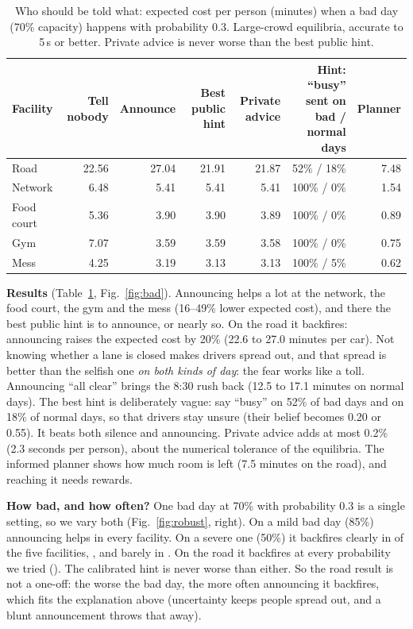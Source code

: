 \documentclass{article}
\begin{document}
\begin{table}[t]\centering\small
\caption{Who should be told what: expected cost per person (minutes) when a bad day (70\% capacity) happens with
probability 0.3. Large-crowd equilibria, accurate to 5\,s or better. Private advice is never worse than the best public hint.}\label{tab:bad}
\begin{tabular}{@{}lrrrrr|r@{}}\toprule
Facility & Tell nobody & Announce & Best public hint & Private advice & Hint: ``busy'' sent on bad / normal days & Planner\\\midrule
Road & 22.56 & \textcolor{cNE}{27.04} & 21.91 & 21.87 & 52\% / 18\% & 7.48\\
Network & 6.48 & 5.41 & 5.41 & 5.41 & 100\% / 0\% & 1.54\\
Food court & 5.36 & 3.90 & 3.90 & 3.89 & 100\% / 0\% & 0.89\\
Gym & 7.07 & 3.59 & 3.59 & 3.58 & 100\% / 0\% & 0.75\\
Mess & 4.25 & 3.19 & 3.13 & 3.13 & 100\% / 5\% & 0.62\\\bottomrule
\end{tabular}
\end{table}

\textbf{Results} (Table~\ref{tab:bad}, Fig.~\ref{fig:bad}). Announcing helps a lot at the network, the food court,
the gym and the mess (16--49\% lower expected cost), and there the best public hint is to announce, or nearly so. On
the road it backfires: announcing raises the expected cost by 20\% (22.6 to 27.0 minutes per car). Not knowing
whether a lane is closed makes drivers spread out, and that spread is better than the selfish one \emph{on both kinds
of day}: the fear works like a toll. Announcing ``all clear'' brings the 8:30 rush back (12.5 to 17.1 minutes on
normal days). The best hint is deliberately vague: say ``busy'' on 52\% of bad days and on 18\% of normal days, so
that drivers stay unsure (their belief becomes 0.20 or 0.55). It beats both silence and announcing. Private advice
adds at most 0.2\% (2.3 seconds per person), about the numerical tolerance of the equilibria. The informed planner
shows how much room is left (7.5 minutes on the road), and reaching it needs rewards.

\textbf{How bad, and how often?} One bad day at 70\% with probability 0.3 is a single setting, so we vary both
(Fig.~\ref{fig:robust}, right). On a mild bad day (85\%) announcing helps in every facility. On a severe one (50\%) it
backfires clearly in \BackfireClear{} of the five facilities, \BackfireList, and barely in \BackfireMarginalList.
On the road it backfires at every probability we tried (\RoadP). The calibrated hint is never worse than either. So the road result is not a one-off: the worse the bad day, the more often announcing it backfires, which fits the
explanation above (uncertainty keeps people spread out, and a blunt announcement throws that away).
\end{document}
